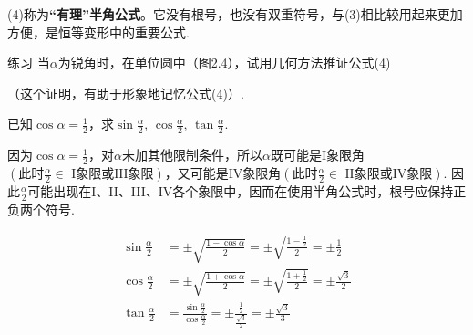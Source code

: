 (4)称为\textbf{“有理”半角公式}。它没有根号，也没有双重符号，与(3)相比较用起来更加方便，是恒等变形中的重要公式.


\noindent
\begin{minipage}{.45\textwidth}
    \begin{thm}{练习}
\CTEXindent 当$\alpha$为锐角时，在单位圆中（图2.4），试用几何方法推证公式(4)

（这个证明，有助于形象地记忆公式(4)）.
\end{thm}
\end{minipage}
\hfill
\begin{minipage}{.45\textwidth}
\centering
\end{minipage}


\begin{example}
已知$\cos\alpha=\frac{1}{2}$，求$\sin\frac{\alpha}{2}$, $\cos\frac{\alpha}{2}$, $\tan\frac{\alpha}{2}$.
\end{example}

\begin{analyze}
因为$\cos\alpha=\frac{1}{2}$，对$\alpha$未加其他限制条件，所以$\alpha$既可能是I象限角$\left(\text{此时}\frac{\alpha}{2}\in\text{ I象限或III象限}\right)$，又可能是IV象限角$\left(\text{此时}\frac{\alpha}{2}\in\text{ II象限或IV象限}\right)$. 因此$\frac{\alpha}{2}$可能出现在I、II、III、IV各个象限中，因而在使用半角公式时，根号应保持正负两个符号.
\end{analyze}

\begin{solution}
\[\begin{split}
\sin\frac{\alpha}{2}&=\pm\sqrt{\frac{1-\cos\alpha}{2}}=\pm\sqrt{\frac{1-\frac{1}{2}}{2}}=\pm\frac{1}{2}\\
\cos\frac{\alpha}{2}&=\pm\sqrt{\frac{1+\cos\alpha}{2}}=\pm\sqrt{\frac{1+\frac{1}{2}}{2}}=\pm\frac{\sqrt{3}}{2}\\
\tan\frac{\alpha}{2}&=\frac{\sin\frac{\alpha}{2}}{\cos\frac{\alpha}{2}}=\pm\frac{\frac{1}{2}}{\frac{\sqrt{3}}{2}}=\pm\frac{\sqrt{3}}{3}\\
\end{split}\]
\end{solution}

